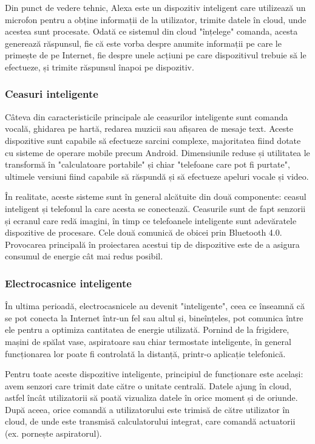 Din punct de vedere tehnic, Alexa este un dispozitiv inteligent care utilizează
un microfon pentru a obține informații de la utilizator, trimite datele în
cloud, unde acestea sunt procesate. Odată ce sistemul din cloud "înțelege"
comanda, acesta generează răspunsul, fie că este vorba despre anumite informații
pe care le primește de pe Internet, fie despre unele acțiuni pe care
dispozitivul trebuie să le efectueze, și trimite răspunsul înapoi pe dispozitiv.

\subsubsection{Ceasuri inteligente}
\label{sec:embed-iot-impl-smartwatch}

Câteva din caracteristicile principale ale ceasurilor inteligente sunt comanda
vocală, ghidarea pe hartă, redarea muzicii sau afișarea de mesaje text. Aceste
dispozitive sunt capabile să efectueze sarcini complexe, majoritatea fiind
dotate cu sisteme de operare mobile precum Android. Dimensiunile reduse și
utilitatea le transformă în "calculatoare portabile" și chiar "telefoane care
pot fi purtate", ultimele versiuni fiind capabile să răspundă și să efectueze
apeluri vocale și video.

În realitate, aceste sisteme sunt în general alcătuite din două componente:
ceasul inteligent și telefonul la care acesta se conectează. Ceasurile sunt de
fapt senzorii și ecranul care redă imagini, în timp ce telefoanele inteligente
sunt adevăratele dispozitive de procesare. Cele două comunică de obicei prin
Bluetooth 4.0. Provocarea principală în proiectarea acestui tip de dispozitive
este de a asigura consumul de energie cât mai redus posibil.

\subsubsection{Electrocasnice inteligente}
\label{sec:embed-iot-impl-smartappliance}

În ultima perioadă, electrocasnicele au devenit "inteligente", ceea ce înseamnă
că se pot conecta la Internet într-un fel sau altul și, bineînțeles, pot
comunica între ele pentru a optimiza cantitatea de energie utilizată. Pornind de
la frigidere, mașini de spălat vase, aspiratoare sau chiar termostate
inteligente, în general funcționarea lor poate fi controlată la distanță,
printr-o aplicație telefonică.

Pentru toate aceste dispozitive inteligente, principiul de funcționare este
același: avem senzori care trimit date către o unitate centrală. Datele ajung în
cloud, astfel încât utilizatorii să poată vizualiza datele în orice moment și de
oriunde. După aceea, orice comandă a utilizatorului este trimisă de către
utilizator în cloud, de unde este transmisă calculatorului integrat, care
comandă actuatorii (ex. pornește aspiratorul).

